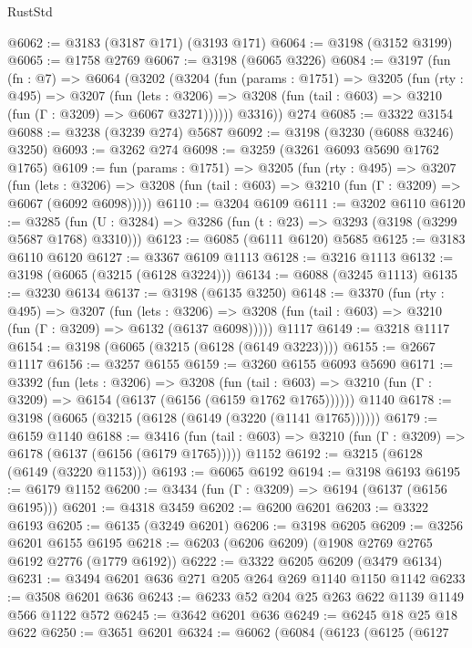 \begin{lexlean}{RustStd}
\begin{coremodule}
@6062 := @3183 (@3187 @171) (@3193 @171)
@6064 := @3198 (@3152 @3199)
@6065 := @1758 @2769
@6067 := @3198 (@6065 @3226)
@6084 := @3197
    (fun (fn : @7) =>
    @6064
      (@3202
        (@3204
          (fun (params : @1751) =>
          @3205
            (fun (rty : @495) =>
            @3207
              (fun (lets : @3206) =>
              @3208 (fun (tail : @603) => @3210 (fun (Γ : @3209) => @6067 @3271))))))
        @3316))
    @274
@6085 := @3322 @3154
@6088 := @3238 (@3239 @274) @5687
@6092 := @3198 (@3230 (@6088 @3246) @3250)
@6093 := @3262 @274
@6098 := @3259 (@3261 @6093 @5690 @1762 @1765)
@6109 := fun (params : @1751) =>
  @3205
    (fun (rty : @495) =>
    @3207
      (fun (lets : @3206) =>
      @3208 (fun (tail : @603) => @3210 (fun (Γ : @3209) => @6067 (@6092 @6098)))))
@6110 := @3204 @6109
@6111 := @3202 @6110
@6120 := @3285 (fun (U : @3284) => @3286 (fun (t : @23) => @3293 (@3198 (@3299 @5687 @1768) @3310)))
@6123 := @6085 (@6111 @6120) @5685
@6125 := @3183 @6110 @6120
@6127 := @3367 @6109 @1113
@6128 := @3216 @1113
@6132 := @3198 (@6065 (@3215 (@6128 @3224)))
@6134 := @6088 (@3245 @1113)
@6135 := @3230 @6134
@6137 := @3198 (@6135 @3250)
@6148 := @3370
    (fun (rty : @495) =>
    @3207
      (fun (lets : @3206) =>
      @3208 (fun (tail : @603) => @3210 (fun (Γ : @3209) => @6132 (@6137 @6098)))))
    @1117
@6149 := @3218 @1117
@6154 := @3198 (@6065 (@3215 (@6128 (@6149 @3223))))
@6155 := @2667 @1117
@6156 := @3257 @6155
@6159 := @3260 @6155 @6093 @5690
@6171 := @3392
    (fun (lets : @3206) =>
    @3208
      (fun (tail : @603) => @3210 (fun (Γ : @3209) => @6154 (@6137 (@6156 (@6159 @1762 @1765))))))
    @1140
@6178 := @3198 (@6065 (@3215 (@6128 (@6149 (@3220 (@1141 @1765))))))
@6179 := @6159 @1140
@6188 := @3416
    (fun (tail : @603) => @3210 (fun (Γ : @3209) => @6178 (@6137 (@6156 (@6179 @1765)))))
    @1152
@6192 := @3215 (@6128 (@6149 (@3220 @1153)))
@6193 := @6065 @6192
@6194 := @3198 @6193
@6195 := @6179 @1152
@6200 := @3434 (fun (Γ : @3209) => @6194 (@6137 (@6156 @6195)))
@6201 := @4318 @3459
@6202 := @6200 @6201
@6203 := @3322 @6193
@6205 := @6135 (@3249 @6201)
@6206 := @3198 @6205
@6209 := @3256 @6201 @6155 @6195
@6218 := @6203 (@6206 @6209) (@1908 @2769 @2765 @6192 @2776 (@1779 @6192))
@6222 := @3322 @6205 @6209 (@3479 @6134)
@6231 := @3494 @6201 @636 @271 @205 @264 @269 @1140 @1150 @1142
@6233 := @3508 @6201 @636
@6243 := @6233 @52 @204 @25 @263 @622 @1139 @1149 @566 @1122 @572
@6245 := @3642 @6201 @636
@6249 := @6245 @18 @25 @18 @622
@6250 := @3651 @6201
@6324 := @6062
    (@6084
      (@6123
        (@6125
          (@6127

\end{coremodule}
\end{lexlean}
